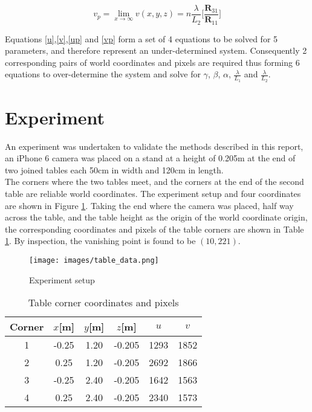 \documentclass[12pt]{article}
\newcommand{\mtx}[1]{\ensuremath{\mathbf{#1}}}
\begin{document}
\begin{equation}\label{vp}
v_p = \lim_{x\to\infty} v(x,y,z) = n\frac{\lambda}{L_2}
\bigg[\frac{\mtx{R}_{31}}
{\mtx{R}_{11}} \bigg]
\end{equation}

Equations \ref{u},\ref{v},\ref{up} and \ref{vp} form a set of 4 equations to be solved for 5 parameters, and therefore represent an under-determined system. Consequently 2 corresponding pairs of world coordinates and pixels are required thus forming 6 equations to over-determine the system and solve for $\gamma$, $\beta$, $\alpha$, $\frac{\lambda}{L_1}$ and $\frac{\lambda}{L_2}$.


\section{Experiment}

An experiment was undertaken to validate the methods described in this report, an iPhone 6 camera was placed on a stand at a height of 0.205m at the end of two joined tables each 50cm in width and 120cm in length.\\

The corners where the two tables meet, and the corners at the end of the second table are reliable world coordinates. The experiment setup and four coordinates are shown in Figure \ref{fig:experiment}. Taking the end where the camera was placed, half way across the table, and the table height as the origin of the world coordinate origin, the corresponding coordinates and pixels of the table corners are shown in Table \ref{table:1}. By inspection, the vanishing point is found to be $(10,221)$. 
\newline

\begin{figure}[h]
\centering
\texttt{[image: images/table\_data.png]}
\caption{Experiment setup}\label{fig:experiment}
\end{figure}

\begin{table}[!htb]
\begin{center}
\begin{tabular}{ |c|c|c|c|c|c| } 
\hline
Corner & $x$[m] & $y$[m] & $z$[m] &$u$ & $v$\\
\hline
1 & -0.25 & 1.20 &-0.205 & 1293 & 1852 \\
2 & 0.25 & 1.20 & -0.205 & 2692 & 1866 \\
3 & -0.25 & 2.40 & -0.205 & 1642 & 1563 \\
4 & 0.25 & 2.40 & -0.205 & 2340 & 1573\\
\hline
\end{tabular}
\end{center}
\caption{Table corner coordinates and pixels}
\label{table:1}
\end{table}
\end{document}
